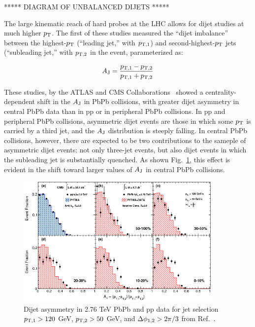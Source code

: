 ***** DIAGRAM OF UNBALANCED DIJETS *****

The large kinematic reach of hard probes at the LHC allows for dijet studies at much higher $p_{\rm T}$.  The first of these studies measured the ``dijet imbalance'' between the highest-$p_{\rm T}$ (``leading jet,'' with $p_{\rm T,1}$) and second-highest-$p_{\rm T}$ jets (``subleading jet,'' with $p_{\rm T, 2}$ in the event, parameterized as: 

\begin{equation}
\label{eq:aj}
A_{\rm J} = \frac{p_{\rm T,1} - p_{\rm T,2}}{p_{\rm T,1} + p_{\rm T,2}}
\end{equation}

\noindent These studies, by the ATLAS and CMS Collaborations~\cite{Aad:2010bu, Chatrchyan:2011sx} showed a centrality-dependent shift in the $A_{\rm J}$ in PbPb collisions, with greater dijet asymmetry in central PbPb data than in pp or in peripheral PbPb collisions.  In pp and peripheral PbPb collisions, asymmetric dijet events are those in which some $p_{\rm T}$ is carried by a third jet, and the $A_{\rm J}$ distribution is steeply falling.  In central PbPb collisions, however, there are expected to be two contributions to the sameple of asymmetric dijet events: not only three-jet events, but also dijet events in which the subleading jet is substantially quenched.  As shown Fig.~\ref{fig:cms_dijets}, this effect is evident in the shift toward larger values of $A_{\rm J}$ in central PbPb collisions. 

\begin{figure}[hbtp]
\begin{center}
\includegraphics[width=0.9\textwidth]{figures/Theory/CMS_dijets.png}
\caption[Dijet asymmetry and in 2.76 TeV PbPb and pp data]{Dijet asymmetry in 2.76 TeV PbPb and pp data for jet selection $p_{\rm T,1} > 120$ GeV, $p_{\rm T,2} > 50$ GeV, and $\Delta\phi_{\rm 1,2} > 2\pi/3$ from Ref.~\cite{Chatrchyan:2011sx}.}
\label{fig:cms_dijets}
\end{center}
\end{figure}

